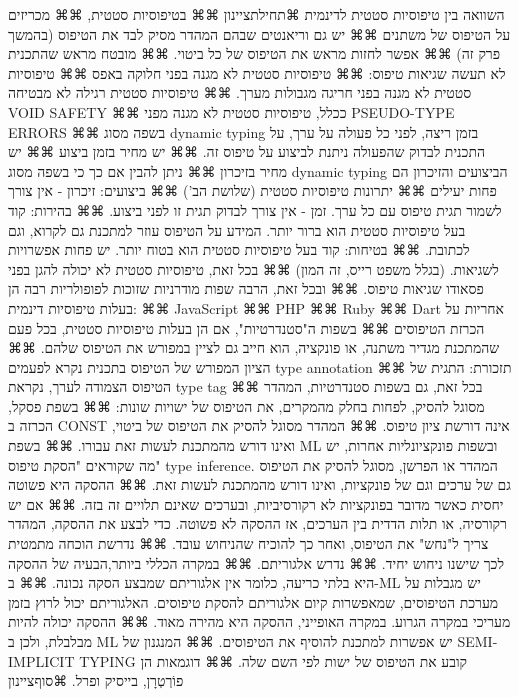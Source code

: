       השוואה בין טיפוסיות סטטית לדינמית
      ⌘תחילת{ציינון}
      ⌘⌘ בטיפוסיות סטטית,
      ⌘⌘ מכריזים על הטיפוס של משתנים
      ⌘⌘ יש גם וריאנטים שבהם המהדר מסיק לבד את הטיפוס (בהמשך פרק זה)
      ⌘⌘ אפשר לחזות מראש את הטיפוס של כל ביטוי.
      ⌘⌘ מובטח מראש שהתכנית לא תעשה שגיאות טיפוס:
      ⌘⌘ טיפוסיות סטטית לא מגנה בפני חלוקה באפס
      ⌘⌘ טיפוסיות סטטית לא מגנה בפני חריגה מגבולות מערך.
      ⌘⌘ טיפוסיות סטטית רגילה לא מבטיחה VOID SAFETY
      ⌘⌘ ככלל, טיפוסיות סטטית לא מגנה מפני PSEUDO-TYPE ERRORS
      ⌘⌘ בשפה מסוג dynamic typing בזמן ריצה, לפני כל פעולה על ערך, על התכנית לבדוק שהפעולה ניתנת לביצוע על טיפוס זה.
      ⌘⌘ יש מחיר בזמן ביצוע
      ⌘⌘ יש מחיר בזיכרון
      ⌘⌘ ניתן להבין אם כך כי בשפה מסוג dynamic typing הביצועים והזיכרון הם פחות יעילים
      ⌘⌘ יתרונות טיפוסיות סטטית (שלושת הב')
      ⌘⌘ ביצועים: זיכרון - אין צורך לשמור תגית טיפוס עם כל ערך. זמן - אין צורך לבדוק תגית זו לפני ביצוע.
      ⌘⌘ בהירות: קוד בעל טיפוסיות סטטית הוא ברור יותר. המידע על הטיפוס עוזר למתכנת גם לקרוא, וגם לכתובת.
      ⌘⌘ בטיחות: קוד בעל טיפוסיות סטטית הוא בטוח יותר. יש פחות אפשרויות לשגיאות. (בגלל משפט רייס, זה המון)
      ⌘⌘ בכל זאת, טיפוסיות סטטית לא יכולה להגן בפני פסאודו שגיאות טיפוס.
      ⌘⌘ ובכל זאת, הרבה שפות מודרניות שזוכות לפופולריות רבה הן בעלות טיפוסיות דינמית:
      ⌘⌘ JavaScript
      ⌘⌘ PHP
      ⌘⌘ Ruby
      ⌘⌘ Dart
      אחריות על הכרזת הטיפוסים
      ⌘⌘ בשפות ה"סטנדרטיות", אם הן בעלות טיפוסיות סטטית, בכל פעם שהמתכנת מגדיר משתנה, או פונקציה, הוא חייב גם לציין במפורש את הטיפוס שלהם.
      ⌘⌘ הציון המפורש של הטיפוס בתכנית נקרא לפעמים type annotation
      ⌘⌘ תזכורת: התגית של הטיפוס הצמודה לערך, נקראת type tag
      ⌘⌘ בכל זאת, גם בשפות סטנדרטיות, המהדר מסוגל להסיק, לפחות בחלק מהמקרים, את הטיפוס של ישויות שונות:
      ⌘⌘ בשפת פסקל, הכרזה ב CONST אינה דורשת ציון טיפוס.
      ⌘⌘ המהדר מסוגל להסיק את הטיפוס של ביטוי, ואינו דורש מהמתכנת לעשות זאת עבורו.
      ⌘⌘ בשפת ML ובשפות פונקציונליות אחרות, יש מה שקוראים "הסקת טיפוס" type inference. המהדר או הפרשן, מסוגל להסיק את הטיפוס גם של ערכים וגם של פונקציות, ואינו דורש מהמתכנת לעשות זאת.
      ⌘⌘ ההסקה היא פשוטה יחסית כאשר מדובר בפונקציות לא רקורסיביות, ובערכים שאינם תלויים זה בזה.
      ⌘⌘ אם יש רקורסיה, או תלות הדדית בין הערכים, אז ההסקה לא פשוטה. כדי לבצע את ההסקה, המהדר צריך ל"נחש" את הטיפוס, ואחר כך להוכיח שהניחוש עובד.
      ⌘⌘ נדרשת הוכחה מתמטית לכך שישנו ניחוש יחיד.
      ⌘⌘ נדרש אלגוריתם.
      ⌘⌘ במקרה הכללי ביותר,הבעיה של ההסקה היא בלתי כריעה, כלומר אין אלגוריתם שמבצע הסקה נכונה.
      ⌘⌘ ב-ML יש מגבלות על מערכת הטיפוסים, שמאפשרות קיום אלגוריתם להסקת טיפוסים. האלגוריתם יכול לרוץ בזמן מעריכי במקרה הגרוע. במקרה האופייני, ההסקה היא מהירה מאוד.
      ⌘⌘ ההסקה יכולה להיות מבלבלת, ולכן ב ML יש אפשרות למתכנת להוסיף את הטיפוסים.
      ⌘⌘ המנגנון של SEMI-IMPLICIT TYPING קובע את הטיפוס של ישות לפי השם שלה.
      ⌘⌘ דוגמאות הן פוֹרְטְרָן, בייסיק ופרל.
    ⌘סוף{ציינון}

